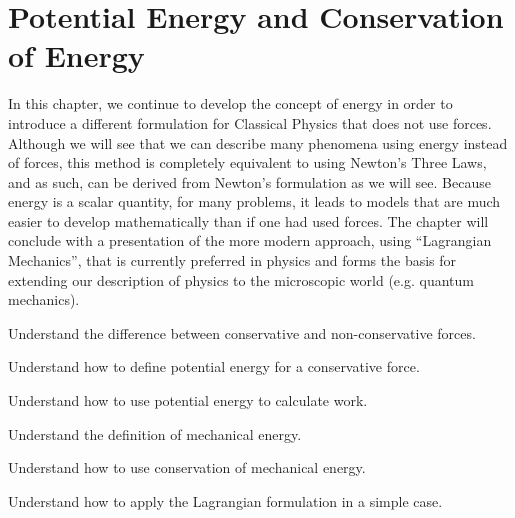 
\chapter{Potential Energy and Conservation of Energy}
\label{chapter:potentialecons}
In this chapter, we continue to develop the concept of energy in order to introduce a different formulation for Classical Physics that does not use forces. Although we will see that we can describe many phenomena using energy instead of forces, this method is completely equivalent to using Newton's Three Laws, and as such, can be derived from Newton's formulation as we will see. Because energy is a scalar quantity, for many problems, it leads to models that are much easier to develop mathematically than if one had used forces. The chapter will conclude with a presentation of the more modern approach, using ``Lagrangian Mechanics'', that is currently preferred in physics and forms the basis for extending our description of physics to the microscopic world (e.g. quantum mechanics). 

\begin{learningObjectives}{
 \item Understand the difference between conservative and non-conservative forces.
 \item Understand how to define potential energy for a conservative force.
 \item Understand how to use potential energy to calculate work.
 \item Understand the definition of mechanical energy.
 \item Understand how to use conservation of mechanical energy.
 \item Understand how to apply the Lagrangian formulation in a simple case.
 }
\end{learningObjectives}

